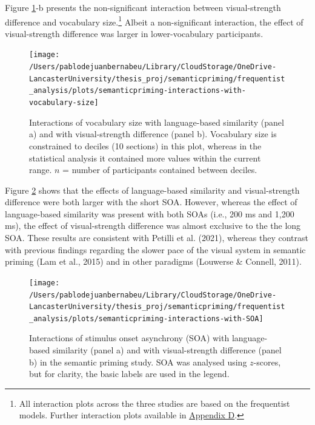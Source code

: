 \documentclass[
  12pt,
  man,floatsintext]{apa7}
\begin{document}
Figure \ref{fig:semanticpriming-interactions-with-vocabulary-size}-b presents the non-significant interaction between visual-strength difference and vocabulary size.\footnote{All interaction plots across the three studies are based on the frequentist models. Further interaction plots available in \protect\hyperlink{appendix-D-interaction-plots}{\underline{Appendix D}}.} Albeit a non-significant interaction, the effect of visual-strength difference was larger in lower-vocabulary participants.



\begin{figure}

{\centering \texttt{[image: /Users/pablodejuanbernabeu/Library/CloudStorage/OneDrive-LancasterUniversity/thesis\_proj/semanticpriming/frequentist\_analysis/plots/semanticpriming-interactions-with-vocabulary-size]} 

}

\caption{Interactions of vocabulary size with language-based similarity (panel a) and with visual-strength difference (panel b). Vocabulary size is constrained to deciles (10 sections) in this plot, whereas in the statistical analysis it contained more values within the current range. \(n\) = number of participants contained between deciles.}\label{fig:semanticpriming-interactions-with-vocabulary-size}
\end{figure}

Figure \ref{fig:semanticpriming-interactions-with-SOA} shows that the effects of language-based similarity and visual-strength difference were both larger with the short SOA. However, whereas the effect of language-based similarity was present with both SOAs (i.e., 200 ms and 1,200 ms), the effect of visual-strength difference was almost exclusive to the the long SOA. These results are consistent with Petilli et al. (2021), whereas they contrast with previous findings regarding the slower pace of the visual system in semantic priming (Lam et al., 2015) and in other paradigms (Louwerse \& Connell, 2011).

\begin{figure}

{\centering \texttt{[image: /Users/pablodejuanbernabeu/Library/CloudStorage/OneDrive-LancasterUniversity/thesis\_proj/semanticpriming/frequentist\_analysis/plots/semanticpriming-interactions-with-SOA]} 

}

\caption{Interactions of stimulus onset asynchrony (SOA) with language-based similarity (panel a) and with visual-strength difference (panel b) in the semantic priming study. SOA was analysed using $z$-scores, but for clarity, the basic labels are used in the legend.}\label{fig:semanticpriming-interactions-with-SOA}
\end{figure}
\end{document}

